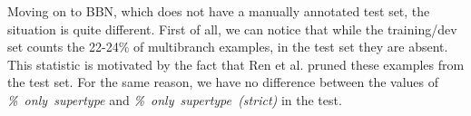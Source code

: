 Moving on to BBN, which does not have a manually annotated test set, the situation is quite different. First of all, we can notice that while the training/dev set counts the 22-24\% of multibranch examples, in the test set they are absent. This statistic is motivated by the fact that Ren et al. pruned these examples from the test set. For the same reason, we have no difference between the values of \textit{\%~only~supertype} and \textit{\%~only~supertype~(strict)} in the test. 

\begin{table}
\centering
\caption{Datasets statistics}
\label{tab:dataset_stats}
\end{table}
